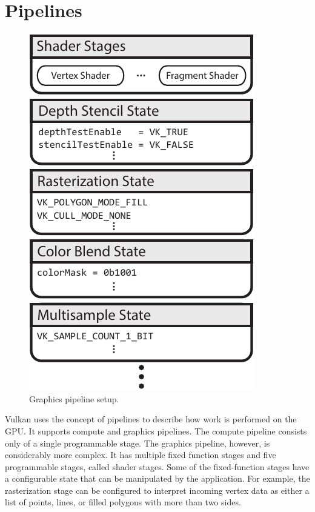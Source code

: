   \section{Pipelines}

    \begin{figure}
      \centering
      \includegraphics{Main/Images/GraphicsPipeline}
      \caption{Graphics pipeline setup.}
      \label{fig:GraphicsPipeline}
    \end{figure}

    Vulkan uses the concept of pipelines to describe how work is performed on the GPU. It supports compute and graphics pipelines. The compute pipeline consists only of a single programmable stage. The graphics pipeline, however, is considerably more complex. It has multiple fixed function stages and five programmable stages, called shader stages. Some of the fixed-function stages have a configurable state that can be manipulated by the \gls{application}. For example, the rasterization stage can be configured to interpret incoming vertex data as either a list of points, lines, or filled polygons with more than two sides.

